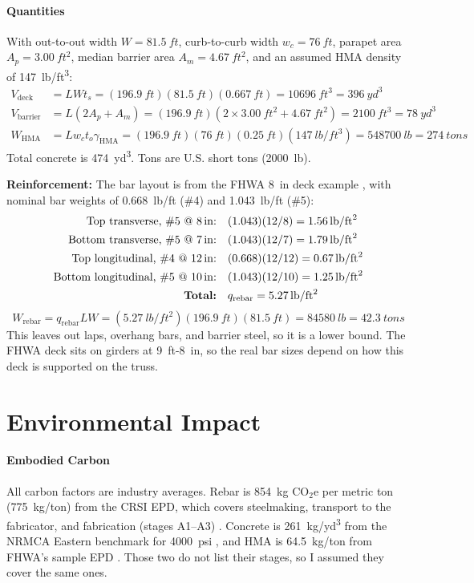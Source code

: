 \documentclass[11pt]{article}
\begin{document}
\paragraph{Quantities}
With out-to-out width $W = \SI{81.5}{ft}$, curb-to-curb width $w_c = \SI{76}{ft}$, parapet area $A_p = \SI{3.00}{ft^2}$, median barrier area $A_m = \SI{4.67}{ft^2}$, and an assumed HMA density of \SI{147}{lb/ft^3}:
\begin{align*}
V_{\text{deck}} &= L W t_s = (\SI{196.9}{ft})(\SI{81.5}{ft})(\SI{0.667}{ft}) = \SI{10696}{ft^3} = \SI{396}{yd^3} \\
V_{\text{barrier}} &= L(2A_p + A_m) = (\SI{196.9}{ft})(2 \times \SI{3.00}{ft^2} + \SI{4.67}{ft^2}) = \SI{2100}{ft^3} = \SI{78}{yd^3} \\
W_{\text{HMA}} &= L w_c t_o \gamma_{\text{HMA}} = (\SI{196.9}{ft})(\SI{76}{ft})(\SI{0.25}{ft})(\SI{147}{lb/ft^3}) = \SI{548700}{lb} = \SI{274}{tons}
\end{align*}
Total concrete is \SI{474}{yd^3}. Tons are U.S. short tons (\SI{2000}{lb}).

\textbf{Reinforcement:} The bar layout is from the FHWA \SI{8}{in} deck example \cite{fhwa_deck}, with nominal bar weights of \SI{0.668}{lb/ft} (\#4) and \SI{1.043}{lb/ft} (\#5):
\begin{align*}
\text{Top transverse, \#5 @ \SI{8}{in}:} &\quad (1.043)(12/8) = \SI{1.56}{lb/ft^2} \\
\text{Bottom transverse, \#5 @ \SI{7}{in}:} &\quad (1.043)(12/7) = \SI{1.79}{lb/ft^2} \\
\text{Top longitudinal, \#4 @ \SI{12}{in}:} &\quad (0.668)(12/12) = \SI{0.67}{lb/ft^2} \\
\text{Bottom longitudinal, \#5 @ \SI{10}{in}:} &\quad (1.043)(12/10) = \SI{1.25}{lb/ft^2} \\
\textbf{Total:} &\quad q_{\text{rebar}} = \SI{5.27}{lb/ft^2}
\end{align*}
\[
W_{\text{rebar}} = q_{\text{rebar}} L W = (\SI{5.27}{lb/ft^2})(\SI{196.9}{ft})(\SI{81.5}{ft}) = \SI{84580}{lb} = \SI{42.3}{tons}
\]
This leaves out laps, overhang bars, and barrier steel, so it is a lower bound. The FHWA deck sits on girders at \SI{9}{ft}-\SI{8}{in}, so the real bar sizes depend on how this deck is supported on the truss.

\section{Environmental Impact}

\paragraph{Embodied Carbon}
All carbon factors are industry averages. Rebar is \SI{854}{kg} CO$_2$e per metric ton (\SI{775}{kg/ton}) from the CRSI EPD, which covers steelmaking, transport to the fabricator, and fabrication (stages A1--A3) \cite{crsi}. Concrete is \SI{261}{kg/yd^3} from the NRMCA Eastern benchmark for \SI{4000}{psi} \cite{nrmca}, and HMA is \SI{64.5}{kg/ton} from FHWA's sample EPD \cite{fhwa_epd}. Those two do not list their stages, so I assumed they cover the same ones.
\end{document}
